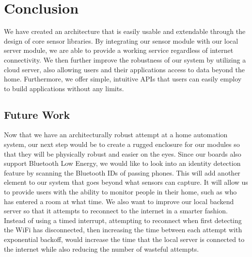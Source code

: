 \documentclass[10pt,twocolumn]{article}
\begin{document}
\section*{Conclusion}
We have created an architecture that is easily usable and extendable through the design of core sensor libraries. By integrating our sensor module with our local server module, we are able to provide a working service regardless of internet connectivity. We then further improve the robustness of our system by utilizing a cloud server, also allowing users and their applications access to data beyond the home. Furthermore, we offer simple, intuitive APIs that users can easily employ to build applications without any limits. 
\subsection*{Future Work}
Now that we have an architecturally robust attempt at a home automation system, our next step would be to create a rugged enclosure for our modules so that they will be physically robust and easier on the eyes. Since our boards also support Bluetooth Low Energy, we would like to look into an identity detection feature by scanning the Bluetooth IDs of passing phones. This will add another element to our system that goes beyond what sensors can capture. It will allow us to provide users with the ability to monitor people in their home, such as who has entered a room at what time. We also want to improve our local backend server so that it attempts to reconnect to the internet in a smarter fashion. Instead of using a timed interrupt, attempting to reconnect when first detecting the WiFi has disconnected, then increasing the time between each attempt with exponential backoff, would increase the time that the local server is connected to the internet while also reducing the number of wasteful attempts.
\end{document}
